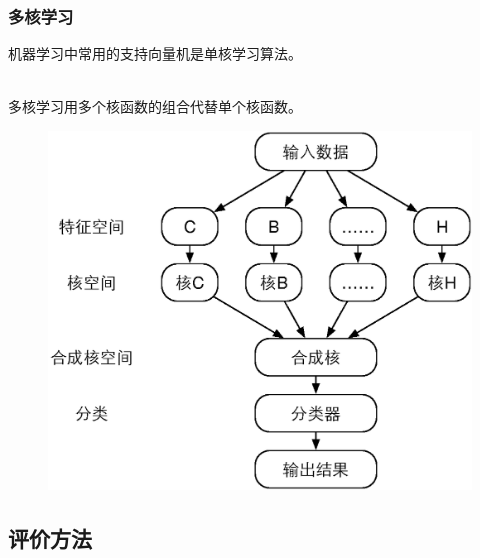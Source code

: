 \documentclass[notheorems,mathserif,table,compress]{beamer}  %
\begin{document}








\begin{frame}
\frametitle{多核学习}
机器学习中常用的{\color{blue}支持向量机}是{\color{red}单核}学习算法。\\
~

{\color{blue}多核学习}用多个核函数的组合代替单个核函数。
\begin{figure}
\includegraphics[width=0.5\linewidth]{multikernel}
\end{figure}
\end{frame}

\subsection{评价方法}
\end{document}
